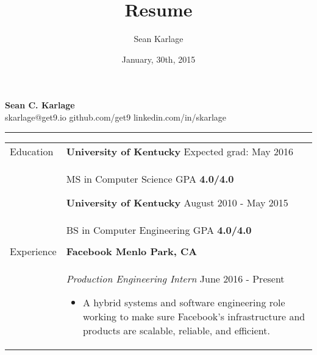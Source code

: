\documentclass[11pt]{article}
\begin{document}
\title{Resume}            %
\author{Sean Karlage}    %
\date{January, 30th, 2015}    %
\thispagestyle{empty}
\pagestyle{empty}

\begin{center}
    {\LARGE\textbf{Sean C. Karlage}} \\
    skarlage@get9.io \hspace{0.20cm} github.com/get9 \hspace{0.20cm} linkedin.com/in/skarlage \vspace{0.01in} \hrule
\end{center}

\vspace{0.05in}\noindent
\begin{tabular}{p{0.75in} p{5.45in}}

    {Education} &

        \textbf{University of Kentucky} \hfill Expected grad: May 2016 \vspace{0.015in} \\ &
        MS in Computer Science \hfill GPA \textbf{4.0/4.0} \vspace{0.09in}

        \textbf{University of Kentucky} \hfill August 2010 - May 2015 \vspace{0.015in} \\ &
        BS in Computer Engineering \hfill GPA \textbf{4.0/4.0} \vspace{0.015in} \\ \\

    {Experience} &
        \textbf{Facebook \hfill Menlo Park, CA} \vspace{0.015in} \\ &
        {\textit{Production Engineering Intern} \hfill June 2016 - Present} \vspace{0.02in}
        \begin{itemize}
            \renewcommand{\labelitemi}{$\diamond$}
            \item A hybrid systems and software engineering role working to make sure Facebook's infrastructure and products are scalable, reliable, and efficient.
        \end{itemize} \vspace{0.09in}


\end{tabular}
\end{document}
